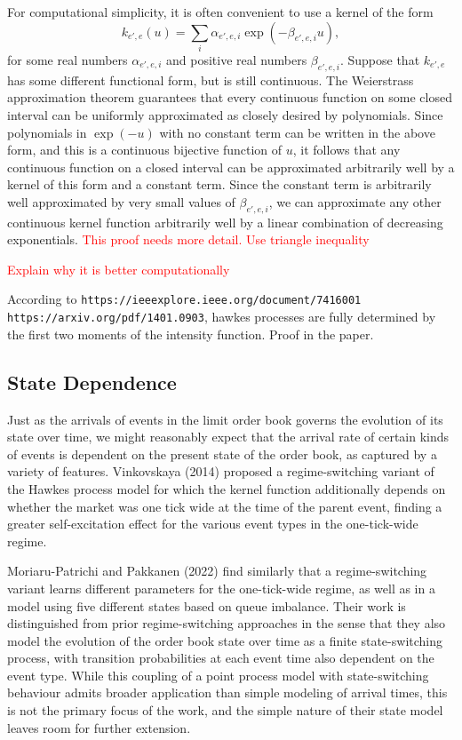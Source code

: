 \documentclass[honours,12pt]{unswthesis}
\numberwithin{equation}{section}
\begin{document}
For computational simplicity, it is often convenient to use a kernel of the form
$$k_{e',e}(u) = \sum_i \alpha_{e',e,i}\exp(-\beta_{e',e,i} u),$$
for some real numbers $\alpha_{e',e,i}$ and positive real numbers $\beta_{e',e,i}$.
Suppose that $k_{e',e}$ has some different functional form, but is still continuous. The Weierstrass approximation theorem guarantees that every continuous function on some closed interval can be uniformly approximated as closely desired by polynomials. Since polynomials in $\exp(-u)$ with no constant term can be written in the above form, and this is a continuous bijective function of $u$, it follows that any continuous function on a closed interval can be approximated arbitrarily well by a kernel of this form and a constant term. Since the constant term is arbitrarily well approximated by very small values of $\beta_{e',e,i}$, we can approximate any other continuous kernel function arbitrarily well by a linear combination of decreasing exponentials.
\textcolor{red}{This proof needs more detail. Use triangle inequality}

\textcolor{red}{Explain why it is better computationally}

According to \texttt{https://ieeexplore.ieee.org/document/7416001 https://arxiv.org/pdf/1401.0903}, hawkes processes are fully determined by the first two moments of the intensity function. Proof in the paper.

\subsection{State Dependence}
Just as the arrivals of events in the limit order book governs the evolution of its state over time, we might reasonably expect that the arrival rate of certain kinds of events is dependent on the present state of the order book, as captured by a variety of features. Vinkovskaya (2014) \cite{Vinkovskaya} proposed a regime-switching variant of the Hawkes process model for which the kernel function additionally depends on whether the market was one tick wide at the time of the parent event, finding a greater self-excitation effect for the various event types in the one-tick-wide regime.

Moriaru-Patrichi and Pakkanen (2022) \cite{MoriaruPatrichiPakkanen} find similarly that a regime-switching variant learns different parameters for the one-tick-wide regime, as well as in a model using five different states based on queue imbalance. Their work is distinguished from prior regime-switching approaches in the sense that they also model the evolution of the order book state over time as a finite state-switching process, with transition probabilities at each event time also dependent on the event type. While this coupling of a point process model with state-switching behaviour admits broader application than simple modeling of arrival times, this is not the primary focus of the work, and the simple nature of their state model leaves room for further extension.
\end{document}
